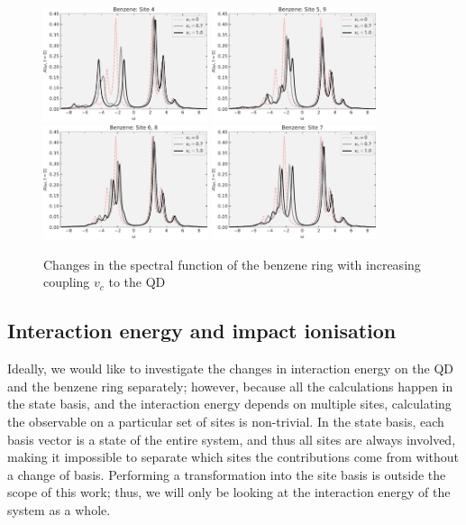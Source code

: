 \begin{figure}[!hbt]
    \centering
    \includegraphics[width=0.43\textwidth]{graph/spectrum_vc_sweep/Benz_4_07_10.pdf}
    \includegraphics[width=0.43\textwidth]{graph/spectrum_vc_sweep/Benz_59_07_10.pdf}
    \includegraphics[width=0.43\textwidth]{graph/spectrum_vc_sweep/Benz_68_07_10.pdf}
    \includegraphics[width=0.43\textwidth]{graph/spectrum_vc_sweep/Benz_7_07_10.pdf}
    \caption{Changes in the spectral function of the benzene ring with increasing coupling $v_c$ to the QD}
    \label{fig:spectrum_vc_sweep_benzene}
\end{figure}

\subsection{Interaction energy and impact ionisation}
Ideally, we would like to investigate the changes in interaction energy on the QD and the benzene ring separately; however, because all the calculations happen in the state basis, and the interaction energy depends on multiple sites, calculating the observable on a particular set of sites is non-trivial. In the state basis, each basis vector is a state of the entire system, and thus all sites are always involved, making it impossible to separate which sites the contributions come from without a change of basis. Performing a transformation into the site basis is outside the scope of this work; thus, we will only be looking at the interaction energy of the system as a whole.
\medskip

